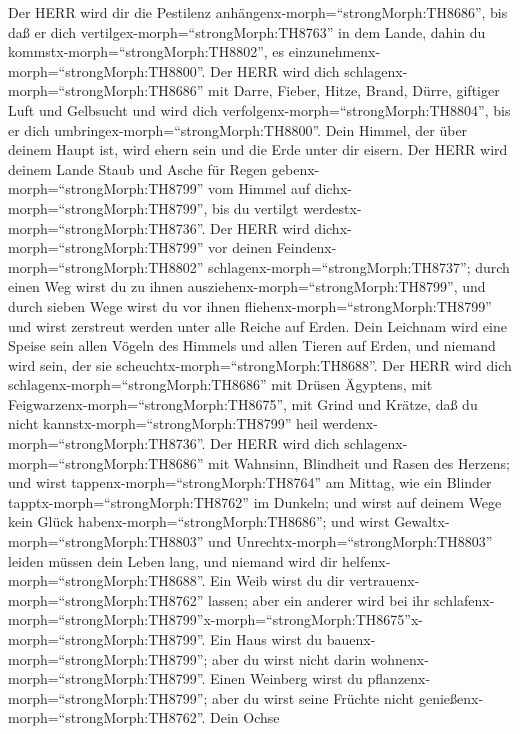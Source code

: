  Der HERR wird dir die Pestilenz
anhängenx-morph=``strongMorph:TH8686'', bis daß er dich
vertilgex-morph=``strongMorph:TH8763'' in dem Lande, dahin du
kommstx-morph=``strongMorph:TH8802'', es
einzunehmenx-morph=``strongMorph:TH8800''.  Der HERR wird
dich schlagenx-morph=``strongMorph:TH8686'' mit Darre, Fieber, Hitze,
Brand, Dürre, giftiger Luft und Gelbsucht und wird dich
verfolgenx-morph=``strongMorph:TH8804'', bis er dich
umbringex-morph=``strongMorph:TH8800''.  Dein Himmel, der
über deinem Haupt ist, wird ehern sein und die Erde unter dir eisern.
 Der HERR wird deinem Lande Staub und Asche für Regen
gebenx-morph=``strongMorph:TH8799'' vom Himmel auf
dichx-morph=``strongMorph:TH8799'', bis du vertilgt
werdestx-morph=``strongMorph:TH8736''.  Der HERR wird
dichx-morph=``strongMorph:TH8799'' vor deinen
Feindenx-morph=``strongMorph:TH8802''
schlagenx-morph=``strongMorph:TH8737''; durch einen Weg wirst du zu
ihnen ausziehenx-morph=``strongMorph:TH8799'', und durch sieben Wege
wirst du vor ihnen fliehenx-morph=``strongMorph:TH8799'' und wirst
zerstreut werden unter alle Reiche auf Erden.  Dein
Leichnam wird eine Speise sein allen Vögeln des Himmels und allen Tieren
auf Erden, und niemand wird sein, der sie
scheuchtx-morph=``strongMorph:TH8688''.  Der HERR wird dich
schlagenx-morph=``strongMorph:TH8686'' mit Drüsen Ägyptens, mit
Feigwarzenx-morph=``strongMorph:TH8675'', mit Grind und Krätze, daß du
nicht kannstx-morph=``strongMorph:TH8799'' heil
werdenx-morph=``strongMorph:TH8736''.  Der HERR wird dich
schlagenx-morph=``strongMorph:TH8686'' mit Wahnsinn, Blindheit und Rasen
des Herzens;  und wirst
tappenx-morph=``strongMorph:TH8764'' am Mittag, wie ein Blinder
tapptx-morph=``strongMorph:TH8762'' im Dunkeln; und wirst auf deinem
Wege kein Glück habenx-morph=``strongMorph:TH8686''; und wirst
Gewaltx-morph=``strongMorph:TH8803'' und
Unrechtx-morph=``strongMorph:TH8803'' leiden müssen dein Leben lang, und
niemand wird dir helfenx-morph=``strongMorph:TH8688''.  Ein
Weib wirst du dir vertrauenx-morph=``strongMorph:TH8762'' lassen; aber
ein anderer wird bei ihr
schlafenx-morph=``strongMorph:TH8799''\textbar x-morph=``strongMorph:TH8675''x-morph=``strongMorph:TH8799''.
Ein Haus wirst du bauenx-morph=``strongMorph:TH8799''; aber du wirst
nicht darin wohnenx-morph=``strongMorph:TH8799''. Einen Weinberg wirst
du pflanzenx-morph=``strongMorph:TH8799''; aber du wirst seine Früchte
nicht genießenx-morph=``strongMorph:TH8762''.  Dein Ochse
